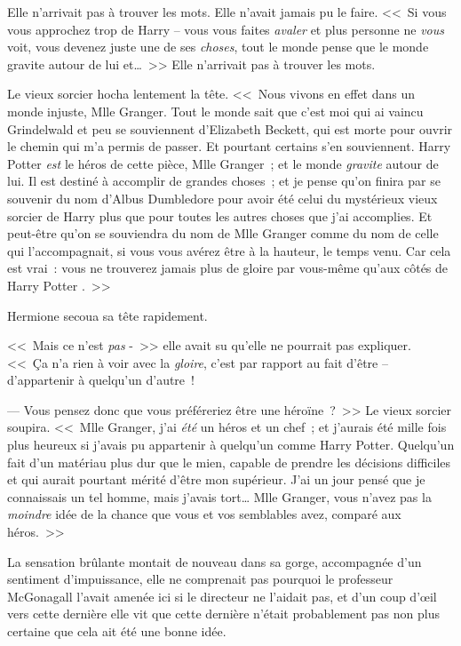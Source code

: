 Elle n'arrivait pas à trouver les mots. Elle n'avait jamais pu le faire. <<~Si vous vous approchez trop de Harry -- vous vous faites \emph{avaler} et plus personne ne \emph{vous} voit, vous devenez juste une de ses \emph{choses}, tout le monde pense que le monde gravite autour de lui et…~>> Elle n'arrivait pas à trouver les mots.

Le vieux sorcier hocha lentement la tête. <<~Nous vivons en effet dans un monde injuste, Mlle Granger. Tout le monde sait que c'est moi qui ai vaincu Grindelwald et peu se souviennent d'Elizabeth Beckett, qui est morte pour ouvrir le chemin qui m'a permis de passer. Et pourtant certains s'en souviennent. Harry Potter \emph{est} le héros de cette pièce, Mlle Granger~; et le monde \emph{gravite} autour de lui. Il est destiné à accomplir de grandes choses~; et je pense qu'on finira par se souvenir du nom d'Albus Dumbledore pour avoir été celui du mystérieux vieux sorcier de Harry plus que pour toutes les autres choses que j'ai accomplies. Et peut-être qu'on se souviendra du nom de Mlle Granger comme du nom de celle qui l'accompagnait, si vous vous avérez être à la hauteur, le temps venu. Car cela est vrai~: vous ne trouverez jamais plus de gloire par vous-même qu'aux côtés de Harry Potter .~>>

Hermione secoua sa tête rapidement.

<<~Mais ce n'est \emph{pas} -~>> elle avait su qu'elle ne pourrait pas expliquer. <<~Ça n'a rien à voir avec la \emph{gloire}, c'est par rapport au fait d'être -- d'appartenir à quelqu'un d'autre~!

--- Vous pensez donc que vous préféreriez être une héroïne~?~>> Le vieux sorcier soupira. <<~Mlle Granger, j'ai \emph{été} un héros et un chef~; et j'aurais été mille fois plus heureux si j'avais pu appartenir à quelqu'un comme Harry Potter. Quelqu'un fait d'un matériau plus dur que le mien, capable de prendre les décisions difficiles et qui aurait pourtant mérité d'être mon supérieur. J'ai un jour pensé que je connaissais un tel homme, mais j'avais tort… Mlle Granger, vous n'avez pas la \emph{moindre} idée de la chance que vous et vos semblables avez, comparé aux héros.~>>

La sensation brûlante montait de nouveau dans sa gorge, accompagnée d'un sentiment d'impuissance, elle ne comprenait pas pourquoi le professeur McGonagall l'avait amenée ici si le directeur ne l'aidait pas, et d'un coup d'œil vers cette dernière elle vit que cette dernière n'était probablement pas non plus certaine que cela ait été une bonne idée.

